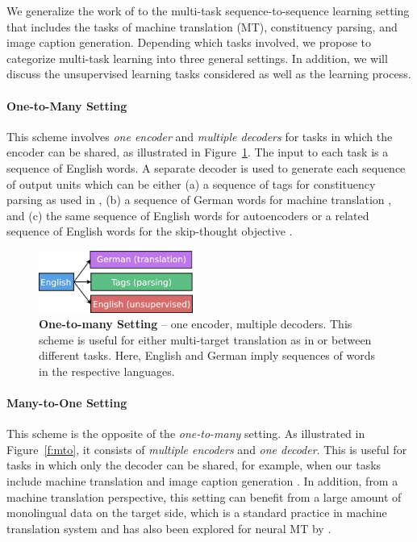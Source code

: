 We generalize the work of \citet{dong15} to the multi-task sequence-to-sequence
learning setting that includes the tasks of machine translation (MT),
constituency parsing, and image caption generation. Depending which tasks 
involved, we propose to categorize multi-task \ssl{} learning into three general
settings.
In addition, we will discuss the unsupervised learning tasks considered as well
as the learning process.

\paragraph{One-to-Many Setting}
This scheme involves {\it one encoder} and {\it multiple decoders} for tasks in
which the encoder can be shared, as illustrated in
Figure~\ref{f:otm}. The input to each task is a sequence of
English words. A separate decoder is used to generate each sequence of
output units which can be either (a) a sequence of tags for
constituency parsing as used in \citep{vinyals15grammar}, (b) a
sequence of German words for machine translation \citep{luong15attn},
and (c) the same sequence of English words for autoencoders or a
related sequence of English words for the skip-thought objective
\citep{kiros15skip}.

\begin{figure}[tbh]
\centering
\includegraphics[width=0.45\textwidth, clip=true, trim= 0 0 0
0]{img/6-1_otm}
\caption{{\bf One-to-many Setting} -- one encoder, multiple decoders. This scheme
is useful for either multi-target translation as
in \cite{dong15} or between different tasks. Here, English and
German imply sequences of words in the respective languages. 
} 
\label{f:otm}
\end{figure}

\paragraph{Many-to-One Setting}
This scheme is the opposite of the {\it one-to-many}
setting. As illustrated in Figure~\ref{f:mto}, it consists of {\it multiple
encoders} and {\it one decoder}. This is useful for tasks in which only the
decoder can be shared, for example, when our tasks include machine translation
and image caption generation \citep{vinyals15caption}. In addition, from a machine
translation perspective, this setting can benefit from a large
amount of monolingual data on the target side, which is a standard
practice in machine translation system and has also been explored
for neural MT by \cite{gulcehre2015using}.

